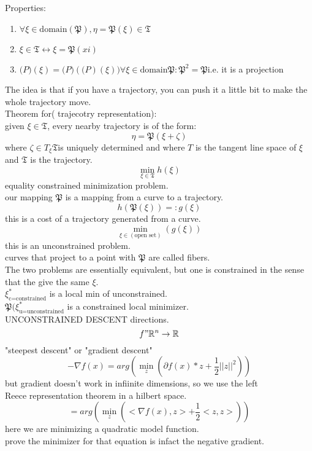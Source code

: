 \documentclass{article}
\begin{document}
Properties:
\begin{enumerate}
    \item $\forall\xi\in\text{domain}(\mathfrak{P}), \eta=\mathfrak{P}(\xi)\in\mathfrak{T}$
    \item $\xi\in\mathfrak{T}\leftrightarrow \xi=\mathfrak{P}(xi)$
    \item $\mathfrak(P)(\xi)=\mathfrak(P)(\mathfrak(P)(\xi))\forall\xi\in\text{domain}\mathfrak{P}:\mathfrak{P}^2=\mathfrak{P}$i.e. it is a projection
\end{enumerate}
The idea is that if you have a trajectory, you can push it a little bit to make the whole trajectory move.\\
Theorem for( trajecotry representation):\\
given $\xi\in\mathfrak{T}$, every nearby trajectory is of the form:\\
\[\eta=\mathfrak{P}(\xi+\zeta)\]
where $\zeta\in T_{\xi}\mathfrak{T}$is uniquely determined and where $T$ is the tangent line space of $\xi$ and $\mathfrak{T}$ is the trajectory.\\
\[\min_{\xi\in\mathfrak{T}}h(\xi)\]
equality constrained minimization problem.\\
our mapping $\mathfrak{P}$ is a mapping from a curve to a trajectory.\\

\[h(\mathfrak{P}(\xi))=:g(\xi)\]
this is a cost of a trajectory generated from a curve.\\
\[\min_{\xi\in(\text{open set})}(g(\xi))\]
this is an unconstrained problem.\\
curves that project to a point with $\mathfrak{P}$ are called fibers.\\

The two problems are essentially equivalent, but one is constrained in the sense that the give the same $\xi$.\\
$\xi_{\text{c=constrained}}^*$ is a local min of unconstrained.\\
$\mathfrak{P}(\xi_{\text{u=unconstrained}}^*$ is a constrained local minimizer.\\

UNCONSTRAINED DESCENT directions.\\
\[f"\mathbb{R}^n\to\mathbb{R}\]
"steepest descent" or "gradient descent"\\
\[-\nabla f(x)=arg(\min_z(\partial f(x)*z+\frac{1}{2}\lvert\lvert z\rvert\rvert^2))\]
but gradient doesn't work in infiinite dimensions, so we use the left\\
Reece representation theorem in a hilbert space.\\
\[=arg(\min_z(<\nabla f(x),z>+\frac{1}{2}<z,z>))\]
here we are minimizing a quadratic model function.\\
prove the minimizer for that equation is infact the negative gradient.\\
\end{document}

